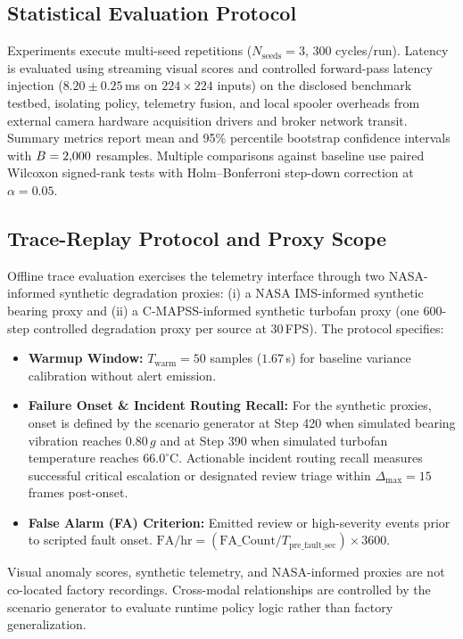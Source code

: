 \documentclass[conference]{IEEEtran}
\begin{document}
\subsection{Statistical Evaluation Protocol}
Experiments execute multi-seed repetitions ($N_{\mathrm{seeds}} = 3$, 300 cycles/run). Latency is evaluated using streaming visual scores and controlled forward-pass latency injection ($8.20 \pm 0.25$\,ms on $224 \times 224$ inputs) on the disclosed benchmark testbed, isolating policy, telemetry fusion, and local spooler overheads from external camera hardware acquisition drivers and broker network transit. Summary metrics report mean and 95\% percentile bootstrap confidence intervals with $B = 2{,}000{}$ resamples. Multiple comparisons against baseline use paired Wilcoxon signed-rank tests with Holm--Bonferroni step-down correction at $\alpha = 0.05$.

\subsection{Trace-Replay Protocol and Proxy Scope}
Offline trace evaluation exercises the telemetry interface through two NASA-informed synthetic degradation proxies: (i) a NASA IMS-informed synthetic bearing proxy and (ii) a C-MAPSS-informed synthetic turbofan proxy (one 600-step controlled degradation proxy per source at 30\,FPS). The protocol specifies:
\begin{itemize}\setlength{\topsep}{1.5pt}\setlength{\itemsep}{0pt}\setlength{\parsep}{0pt}\setlength{\parskip}{0pt}
\item \textbf{Warmup Window:} $T_{\mathrm{warm}} = 50$ samples ($1.67$\,s) for baseline variance calibration without alert emission.
    \item \textbf{Failure Onset \& Incident Routing Recall:} For the synthetic proxies, onset is defined by the scenario generator at Step 420 when simulated bearing vibration reaches $0.80\,g$ and at Step 390 when simulated turbofan temperature reaches $66.0^{\circ}\mathrm{C}$. Actionable incident routing recall measures successful critical escalation or designated review triage within $\Delta_{\max} = 15$ frames post-onset.
    \item \textbf{False Alarm (FA) Criterion:} Emitted review or high-severity events prior to scripted fault onset. $\mathrm{FA/hr} = (\mathrm{FA\_Count} / T_{\mathrm{pre\_fault\_sec}}) \times 3600$.
\end{itemize}
Visual anomaly scores, synthetic telemetry, and NASA-informed proxies are not co-located factory recordings. Cross-modal relationships are controlled by the scenario generator to evaluate runtime policy logic rather than factory generalization.
\end{document}
